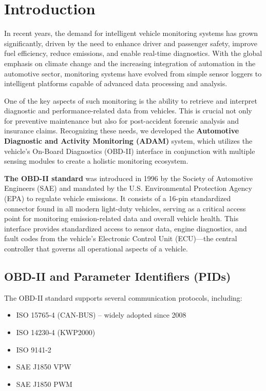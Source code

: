\section{Introduction}
In recent years, the demand for intelligent vehicle monitoring systems has grown significantly, driven by the need to enhance driver and passenger safety, improve fuel efficiency, reduce emissions, and enable real-time diagnostics. With the global emphasis on climate change and the increasing integration of automation in the automotive sector, monitoring systems have evolved from simple sensor loggers to intelligent platforms capable of advanced data processing and analysis.

One of the key aspects of such monitoring is the ability to retrieve and interpret diagnostic and performance-related data from vehicles. This is crucial not only for preventive maintenance but also for post-accident forensic analysis and insurance claims. Recognizing these needs, we developed the \textbf{Automotive Diagnostic and Activity Monitoring (ADAM)} system, which utilizes the vehicle's On-Board Diagnostics (OBD-II) interface in conjunction with multiple sensing modules to create a holistic monitoring ecosystem.

\textbf{The OBD-II standard} was introduced in 1996 by the Society of Automotive Engineers (SAE) and mandated by the U.S. Environmental Protection Agency (EPA) to regulate vehicle emissions. It consists of a 16-pin standardized connector found in all modern light-duty vehicles, serving as a critical access point for monitoring emission-related data and overall vehicle health. This interface provides standardized access to sensor data, engine diagnostics, and fault codes from the vehicle’s Electronic Control Unit (ECU)—the central controller that governs all operational aspects of a vehicle.

\subsection{OBD-II and Parameter Identifiers (PIDs)}
The OBD-II standard supports several communication protocols, including:
\begin{itemize}
    \item ISO 15765-4 (CAN-BUS) – widely adopted since 2008
    \item ISO 14230-4 (KWP2000)
    \item ISO 9141-2
    \item SAE J1850 VPW
    \item SAE J1850 PWM
\end{itemize}

